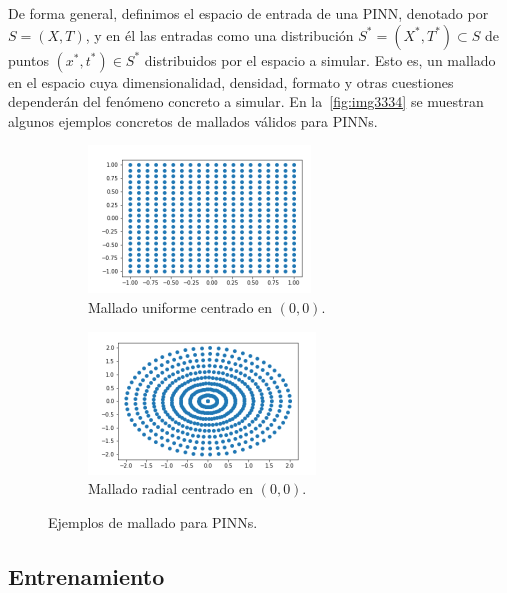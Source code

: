 De forma general, definimos el espacio de entrada de una PINN, denotado por $ S=(X,T) $, y en él las entradas como una distribución $S^*=(X^*,T^*)\subset S$ de puntos $(x^*,t^*)\in S^*$ distribuidos por el espacio a simular. Esto es, un mallado en el espacio cuya dimensionalidad, densidad, formato y otras cuestiones dependerán del fenómeno concreto a simular. En la~\autoref{fig:img3334} se muestran algunos ejemplos concretos de mallados válidos para PINNs. 

\begin{figure}[htbp]

    \begin{subfigure}{0.5\textwidth}
    \centering
    \includegraphics[width=0.7\linewidth]{img/img33.png} 
    \caption{Mallado uniforme centrado en $(0,0)$.}
    \label{fig:img33}
    \end{subfigure}   
    \begin{subfigure}{0.5\textwidth}
    \centering
    \includegraphics[width=0.7\linewidth]{img/img34.png}
    \caption{Mallado radial centrado en $(0,0)$.}
    \label{fig:img34}
    \end{subfigure}

\caption{Ejemplos de mallado para PINNs.}
\label{fig:img3334}
\end{figure}

\subsection{Entrenamiento}\label{sec:7.2.3}

